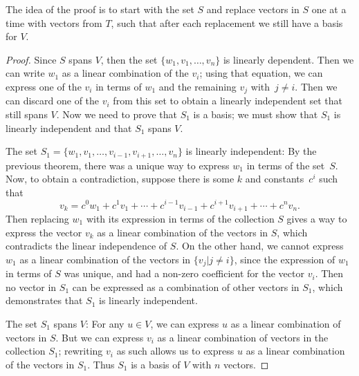 
The idea of the proof is to start with the set $S$ and replace vectors in $S$ one at a time with vectors from $T$, such that after each replacement we still have a basis for $V$.


\begin{proof}
Since $S$ spans $V$, then the set $\{w_1, v_1, \ldots, v_n \}$ is linearly dependent.  Then we can write $w_1$ as a linear combination of the $v_i$; using that equation, we can express one of the $v_i$ in terms of $w_1$ and the remaining $v_j$ with~$j\neq i$.  Then we can discard one of the $v_i$ from this set to obtain a linearly independent set that still spans $V$.  Now we need to prove that $S_1$ is a basis; we must show that $S_1$ is linearly independent and that $S_1$ spans $V$.

The set $S_1=\{w_1, v_1, \ldots, v_{i-1}, v_{i+1},\ldots, v_n \}$ is linearly independent:  By the previous theorem, there was a unique way to express $w_1$ in terms of the set~$S$.  Now, to obtain a contradiction, suppose there is some $k$ and constants~$c^i$ such that
\[
v_k = c^0w_1+c^1v_1+\cdots + c^{i-1}v_{i-1} + c^{i+1}v_{i+1} + \cdots + c^nv_n.
\]
Then replacing $w_1$ with its expression in terms of the collection $S$ gives a way to express the vector $v_k$ as a linear combination of the vectors in $S$, which contradicts the linear independence of $S$.  On the other hand, we cannot express $w_1$ as a linear combination of the vectors in $\{v_j | j\neq i\}$, since the expression of $w_1$ in terms of $S$ was unique, and had a non-zero coefficient for the vector $v_i$.  Then no vector in $S_1$ can be expressed as a combination of other vectors in $S_1$, which demonstrates that $S_1$ is linearly independent.

The set $S_1$ spans $V$:  For any $u\in V$, we can express $u$ as a linear combination of vectors in $S$.  But we can express $v_i$ as a linear combination of vectors in the collection $S_1$; rewriting $v_i$ as such allows us to express $u$ as a linear combination of the vectors in $S_1$. Thus $S_1$ is a basis of $V$ with $n$ vectors.


\end{proof}
